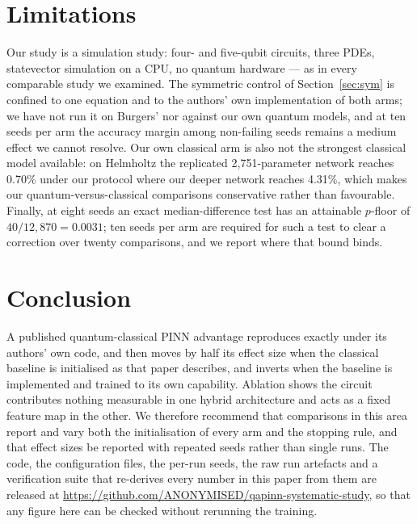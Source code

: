 \documentclass[conference,a4paper]{IEEEtran}
\begin{document}
\section{Limitations}

Our study is a simulation study: four- and five-qubit circuits, three PDEs, statevector
simulation on a CPU, no quantum hardware --- as in every comparable study we examined. The
symmetric control of Section~\ref{sec:sym} is confined to one equation and to the authors'
own implementation of both arms; we have not run it on Burgers' nor against our own
quantum models, and at ten seeds per arm the accuracy margin among non-failing seeds
remains a medium effect we cannot resolve. Our own
classical arm is also not the strongest classical model available: on Helmholtz the
replicated 2{,}751-parameter network reaches 0.70\% under our protocol where our deeper
network reaches 4.31\%, which makes our quantum-versus-classical comparisons conservative
rather than favourable. Finally, at eight seeds an exact median-difference test has an
attainable $p$-floor of $40/12{,}870 = 0.0031$; ten seeds per arm are required for such a
test to clear a correction over twenty comparisons, and we report where that bound binds.

\section{Conclusion}

A published quantum-classical PINN advantage reproduces exactly under its authors' own
code, and then moves by half its effect size when the classical baseline is initialised as
that paper describes, and inverts when the baseline is implemented and trained to its own capability.
Ablation shows the circuit contributes nothing measurable in one hybrid architecture and
acts as a fixed feature map in the other. We therefore recommend that comparisons in this
area report and vary both the initialisation of every arm and the stopping rule, and that
effect sizes be reported with repeated seeds rather than single runs. The code, the configuration files, the per-run seeds, the raw
run artefacts and a verification suite that re-derives every number in this paper from
them are released at \url{https://github.com/ANONYMISED/qapinn-systematic-study}, so that
any figure here can be checked without rerunning the training.
\end{document}
